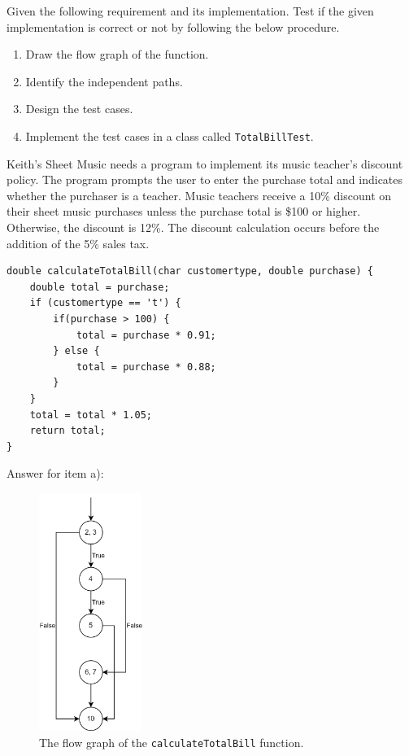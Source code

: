 \begin{exercise}
    Given the following requirement and its implementation. Test if the given implementation is correct or not by following the below procedure.
    \begin{enumerate}
        \item Draw the flow graph of the function.
        \item Identify the independent paths.
        \item Design the test cases.
        \item Implement the test cases in a class called \lstinline!TotalBillTest!.
    \end{enumerate}

    Keith’s Sheet Music needs a program to implement its music teacher’s discount policy. The program prompts the user to enter the purchase total and indicates whether the purchaser is a teacher. Music teachers receive a 10\% discount on their sheet music purchases unless the purchase total is \$100 or higher. Otherwise, the discount is 12\%. The discount calculation occurs before the addition of the 5\% sales tax.
    
    \begin{lstlisting}[caption={A proposed solution for the above requirement.}]
double calculateTotalBill(char customertype, double purchase) {
    double total = purchase;
    if (customertype == 't') {
        if(purchase > 100) {
            total = purchase * 0.91;
        } else {
            total = purchase * 0.88;
        }
    }
    total = total * 1.05;
    return total;
}
    \end{lstlisting}

    Answer for item a):
    \begin{figure}[H]
        \centering
        \includegraphics[width=0.3\textwidth]{images/exercise-6a-solution.png}
        \caption{The flow graph of the \lstinline!calculateTotalBill! function.}
        \label{fig:ex6-fg}
    \end{figure}


\end{exercise}
